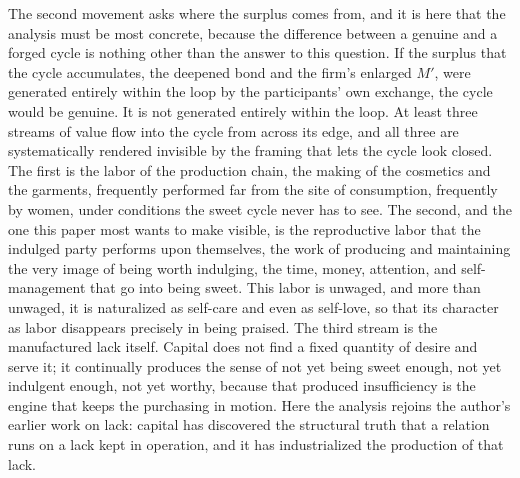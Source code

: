 \documentclass[11pt,a4paper]{article}
\begin{document}
The second movement asks where the surplus comes from, and it is here that the analysis must be most concrete, because the difference between a genuine and a forged cycle is nothing other than the answer to this question. If the surplus that the cycle accumulates, the deepened bond and the firm's enlarged $M'$, were generated entirely within the loop by the participants' own exchange, the cycle would be genuine. It is not generated entirely within the loop. At least three streams of value flow into the cycle from across its edge, and all three are systematically rendered invisible by the framing that lets the cycle look closed. The first is the labor of the production chain, the making of the cosmetics and the garments, frequently performed far from the site of consumption, frequently by women, under conditions the sweet cycle never has to see. The second, and the one this paper most wants to make visible, is the reproductive labor that the indulged party performs upon themselves, the work of producing and maintaining the very image of being worth indulging, the time, money, attention, and self-management that go into being sweet. This labor is unwaged, and more than unwaged, it is naturalized as self-care and even as self-love, so that its character as labor disappears precisely in being praised. The third stream is the manufactured lack itself. Capital does not find a fixed quantity of desire and serve it; it continually produces the sense of not yet being sweet enough, not yet indulgent enough, not yet worthy, because that produced insufficiency is the engine that keeps the purchasing in motion. Here the analysis rejoins the author's earlier work on lack: capital has discovered the structural truth that a relation runs on a lack kept in operation, and it has industrialized the production of that lack.
\end{document}
